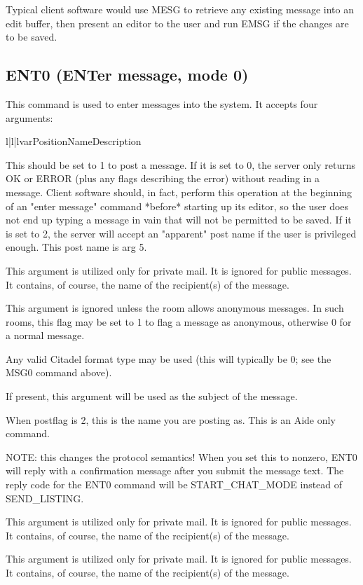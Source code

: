  Typical client software would use MESG to retrieve any existing message into
an edit buffer, then present an editor to the user and run EMSG if the changes
are to be saved.



\subsection{ENT0 (ENTer message, mode 0)}

 This command is used to enter messages into the system.  It accepts four
arguments:


\begin{tableiii}{l|l|l}{var}{Position}{Name}{Description}

    {This should be set to 1 to post a message.  If it is set to 0, the server
    only returns OK or ERROR (plus any flags describing the error) without
    reading in a message.  Client software should, in fact, perform this
    operation at the beginning of an "enter message" command *before* starting
    up its editor, so the user does not end up typing a message in vain that
    will not be permitted to be saved.  If it is set to 2, the server will
    accept an "apparent" post name if the user is privileged enough. This post
    name is arg 5.}

    {This argument is utilized only for private mail.  It is ignored for public
    messages.  It contains, of course, the name of the recipient(s) of the
    message.}

    {This argument is ignored unless the room allows anonymous messages.  In
    such rooms, this flag may be set to 1 to flag a message as anonymous,
    otherwise 0 for a normal message.}

    {Any valid Citadel format type may be used (this will typically be 0; see
    the MSG0 command above).}

    {If present, this argument will be used as the subject of the message.}

    {When postflag is 2, this is the name you are posting as. This is an Aide
    only command.}

    {NOTE: this changes the protocol semantics!  When you set this to nonzero,
    ENT0 will reply with a confirmation message after you submit the message
    text.  The reply code for the ENT0 command will be START_CHAT_MODE instead
    of SEND_LISTING.}

    {This argument is utilized only for private mail.  It is ignored for public
    messages.  It contains, of course, the name of the recipient(s) of the
    message.}

    {This argument is utilized only for private mail.  It is ignored for public
    messages.  It contains, of course, the name of the recipient(s) of the
    message.}

\end{tableiii}


